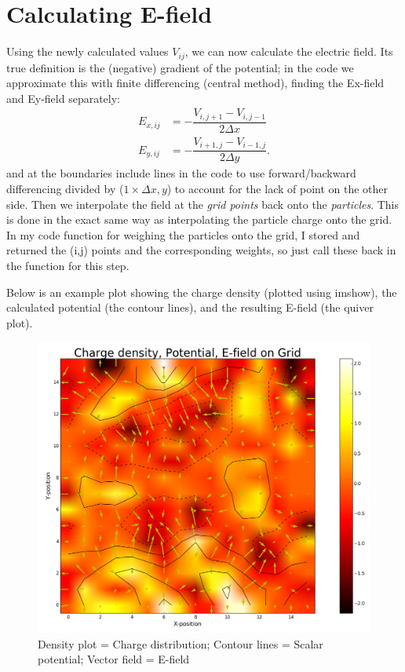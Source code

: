\documentclass{article}
\begin{document}
\section{Calculating E-field}
Using the newly calculated values $V_{ij}$, we can now calculate the electric field. Its true definition is the (negative) gradient of the potential; in the code we approximate this with finite differencing (central method), finding the Ex-field and Ey-field separately:
\begin{equation}
\begin{split}
E_{x,ij} &= -\dfrac{V_{i,j+1} - V_{i,j-1}}{2\Delta x}\\
E_{y,ij} &= -\dfrac{V_{i+1,j} - V_{i-1,j}}{2\Delta y}.
\end{split}
\end{equation}
and at the boundaries include lines in the code to use forward/backward differencing divided by ($1\times\Delta x,y$) to account for the lack of point on the other side.
\newline
Then we interpolate the field at the \textit{grid points} back onto the \textit{particles}. This is done in the exact same way as interpolating the particle charge onto the grid. In my code function for weighing the particles onto the grid, I stored and returned the (i,j) points and the corresponding weights, so just call these back in the function for this step. 

Below is an example plot showing the charge density (plotted using imshow), the calculated potential (the contour lines), and the resulting E-field (the quiver plot). 

\begin{figure}[H]
\begin{center}
\includegraphics[scale=0.4]{nother_grid.png}
\caption{Density plot = Charge distribution; Contour lines = Scalar potential; Vector field = E-field}
\end{center}
\end{figure}
\end{document}
